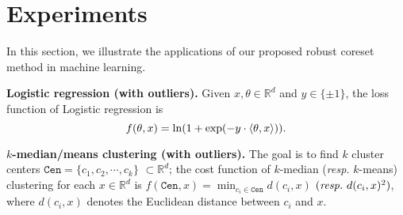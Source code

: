 \documentclass{article}
\newtheorem{theorem}{Theorem}
\begin{document}
 



\section{Experiments}
\label{sec-app}
In this section, we illustrate the applications of our proposed robust coreset method in machine learning. 

\textbf{Logistic regression (with outliers).} 
Given $ x,\theta \in\mathbb{R}^d $ and $ y\in\{\pm 1 \} $, the loss function of Logistic regression is 
\begin{equation}
	f(\theta,x) = \ln (1+\exp(-y\cdot\braket{\theta,x} )).
\end{equation}


\textbf{$k$-median/means clustering (with outliers).} 
The goal is to find $k$ cluster centers $ \mathtt{Cen}=\{c_1,c_2,\cdots,c_k \} $ $\subset\mathbb{R}^d$; the cost function of $ k $-median ({\em resp.} $k$-means) clustering for each $x\in \mathbb{R}^d$ is $ f(\mathtt{Cen},x)=\min_{c_i\in \mathtt{Cen}}d(c_i,x)$ $ (\text{\em resp.}\ d(c_i,x)^2) $, where $d(c_i,x)$ denotes the Euclidean distance between $c_i$ and $x$.
\end{document}
